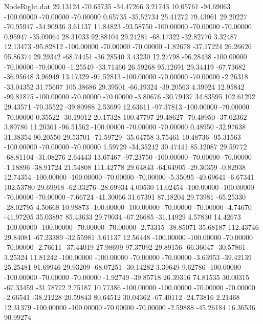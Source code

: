\begin{filecontents}{NodeRight.dat}
  29.13124  -70.65735  -34.47266     3.21743   10.05761  -94.69063 -100.00000  -70.00000  -70.00000    0.65735  -35.52734   25.41272   79.43961
  29.20227  -70.95947  -34.90936     3.61137   11.84823  -93.58750 -100.00000  -70.00000  -70.00000    0.95947  -35.09064   28.31033   92.88104
  29.24281  -68.17322  -32.82776     3.32487   12.13473  -95.82812 -100.00000  -70.00000  -70.00000   -1.82678  -37.17224   26.26626   95.86374
  29.29342  -68.74451  -36.28540     3.43230   12.27798  -96.28438 -100.00000  -70.00000  -70.00000   -1.25549  -33.71460   26.59268   95.12691
  29.34419  -67.73682  -36.95648     3.96949   13.17329  -97.52813 -100.00000  -70.00000  -70.00000   -2.26318  -33.04352   31.75607  105.38686
  29.39501  -66.19324  -39.20563     4.39924   12.95842  -99.81875 -100.00000  -70.00000  -70.00000   -3.80676  -30.79437   34.83595  102.61292
  29.43571  -70.35522  -39.80988     2.53699   12.63611  -97.37813 -100.00000  -70.00000  -70.00000    0.35522  -30.19012   20.17328  100.47797
  29.48627  -70.48950  -37.02362     3.89786   11.20361  -96.51562 -100.00000  -70.00000  -70.00000    0.48950  -32.97638   31.38354   90.20550
  29.53701  -71.59729  -35.64758     3.75461   10.48736  -95.31563 -100.00000  -70.00000  -70.00000    1.59729  -34.35242   30.47441   85.12087
  29.59772  -68.81104  -31.08276     2.64443   13.67467  -97.23750 -100.00000  -70.00000  -70.00000   -1.18896  -38.91724   21.54808  111.42778
  29.64843  -64.64905  -29.30359    -0.82938   12.74354 -100.00000 -100.00000  -70.00000  -70.00000   -5.35095  -40.69641   -6.67341  102.53780
  29.69918  -62.33276  -28.69934     4.00530   11.02454 -100.00000 -100.00000  -70.00000  -70.00000   -7.66724  -41.30066   31.67391   87.18204
  29.73981  -65.25330  -28.02795     4.50668   10.98873 -100.00000 -100.00000  -70.00000  -70.00000   -4.74670  -41.97205   35.03897   85.43633
  29.79034  -67.26685  -31.14929     4.57830   14.42673 -100.00000 -100.00000  -70.00000  -70.00000   -2.73315  -38.85071   35.68187  112.43746
  29.84081  -67.23389  -32.55981     3.61137   12.56448 -100.00000 -100.00000  -70.00000  -70.00000   -2.76611  -37.44019   27.98699   97.37092
  29.89156  -66.36047  -30.57861     3.25324   11.81242 -100.00000 -100.00000  -70.00000  -70.00000   -3.63953  -39.42139   25.25481   91.69946
  29.93209  -68.07251  -30.14282     3.39649    9.62786 -100.00000 -100.00000  -70.00000  -70.00000   -1.92749  -39.85718   26.39316   74.81535
  30.00315  -67.33459  -31.78772     2.75187   10.77386 -100.00000 -100.00000  -70.00000  -70.00000   -2.66541  -38.21228   20.59843   80.64512
  30.04362  -67.40112  -24.73816     2.21468   12.31379 -100.00000 -100.00000  -70.00000  -70.00000   -2.59888  -45.26184   16.36536   90.99274

\end{filecontents}
